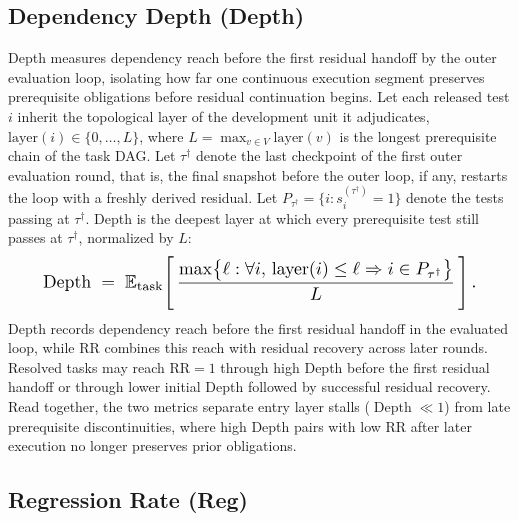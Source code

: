 \subsection{Dependency Depth (Depth)}\label{app:depth}

Depth measures dependency reach before the first residual handoff by the outer evaluation loop, isolating how far one continuous execution segment preserves prerequisite obligations before residual continuation begins. Let each released test $i$ inherit the topological layer of the development unit it adjudicates, $\mathrm{layer}(i) \in \{0, \dots, L\}$, where $L = \max_{v \in V} \mathrm{layer}(v)$ is the longest prerequisite chain of the task DAG. Let $\tau^{\dagger}$ denote the last checkpoint of the first outer evaluation round, that is, the final snapshot before the outer loop, if any, restarts the loop with a freshly derived residual. Let $P_{\tau^{\dagger}} = \{i : s_i^{(\tau^{\dagger})} = 1\}$ denote the tests passing at $\tau^{\dagger}$. Depth is the deepest layer at which every prerequisite test still passes at $\tau^{\dagger}$, normalized by $L$:
\begin{equation}
\resizebox{.9\columnwidth}{!}{$\displaystyle
\operatorname{Depth} \;=\; \mathbb{E}_{\text{task}}\!\left[\,\frac{\max\bigl\{\ell : \forall i,\, \mathrm{layer}(i) \leq \ell \Rightarrow i \in P_{\tau^{\dagger}}\bigr\}}{L}\,\right].
$}
\end{equation}
Depth records dependency reach before the first residual handoff in the evaluated loop, while RR combines this reach with residual recovery across later rounds. Resolved tasks may reach $\mathrm{RR}=1$ through high Depth before the first residual handoff or through lower initial Depth followed by successful residual recovery. Read together, the two metrics separate entry layer stalls ($\operatorname{Depth}{\ll}1$) from late prerequisite discontinuities, where high Depth pairs with low RR after later execution no longer preserves prior obligations.

\subsection{Regression Rate (Reg)}\label{app:regression-rate}

